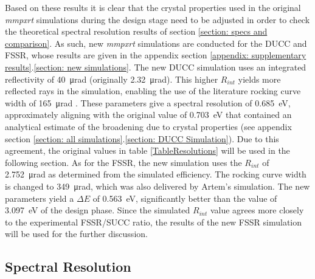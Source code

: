 Based on these results it is clear that the crystal properties used in the original \textit{mmpxrt} simulations during the design stage need to be adjusted in order to check the theoretical spectral resolution results of section \ref{section: specs and comparison}. As such, new \textit{mmpxrt} simulations are conducted for the DUCC and FSSR, whose results are given in the appendix section \ref{appendix: supplementary results}.\ref{section: new simulations}. The new DUCC simulation uses an integrated reflectivity of \SI{40}{\micro\radian} (originally \SI{2.32}{\micro\radian}). This higher $R_{int}$ yields more reflected rays in the simulation, enabling the use of the literature rocking curve width of \SI{165}{\micro\radian} \citep{rajesh2015growth}. These parameters give a spectral resolution of \SI{0.685}{\electronvolt}, approximately aligning with the original value of \SI{0.703}{\electronvolt} that contained an analytical estimate of the broadening due to crystal properties (see appendix section \ref{section: all simulations}.\ref{section: DUCC Simulation}). Due to this agreement, the original values in table \ref{TableResolutions} will be used in the following section. As for the FSSR, the new simulation uses the $R_{int}$ of \SI{2.752}{\micro\radian} as determined from the simulated efficiency. The rocking curve width is changed to \SI{349}{\micro\radian}, which was also delivered by Artem's simulation. The new parameters yield a $\Delta E$ of \SI{0.563}{\electronvolt}, significantly better than the value of \SI{3.097}{\electronvolt} of the design phase. Since the simulated $R_{int}$ value agrees more closely to the experimental FSSR/SUCC ratio, the results of the new FSSR simulation will be used for the further discussion. 


\subsection{Spectral Resolution}
\label{subsection: spectral resolution}

